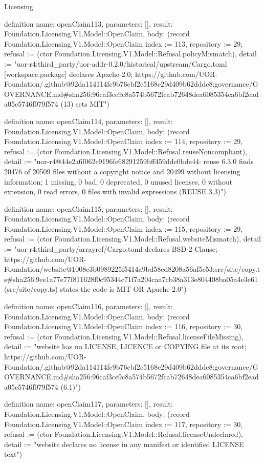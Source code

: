 \begin{lexlean}{Licensing}
\begin{semanticmodule}
definition{
  name: openClaim113,
  parameters: [],
  result: Foundation.Licensing.V1.Model::OpenClaim,
  body: (record Foundation.Licensing.V1.Model::OpenClaim {index := 113, repository := 29, refusal := (ctor Foundation.Licensing.V1.Model::Refusal.policyMismatch), detail := "uor-r4:third_party/uor-addr-0.2.0/historical/upstream/Cargo.toml [workspace.package] declares Apache-2.0; https://github.com/UOR-Foundation/.github@92da114114fc9b76cbf2c5168e29d409b62ddde8:governance/GOVERNANCE.md#sha256:96caf3ce9c8a574b5672fcab72648dea6085354ca6bf2eada05e5746f079f574 (13) sets MIT"})
}

definition{
  name: openClaim114,
  parameters: [],
  result: Foundation.Licensing.V1.Model::OpenClaim,
  body: (record Foundation.Licensing.V1.Model::OpenClaim {index := 114, repository := 29, refusal := (ctor Foundation.Licensing.V1.Model::Refusal.reuseNoncompliant), detail := "uor-r4@44e2a6f062e9196fe68291259bff459dde0bde44: reuse 6.3.0 finds 20476 of 20509 files without a copyright notice and 20499 without licensing information; 1 missing, 0 bad, 0 deprecated, 0 unused licenses, 0 without extension, 0 read errors, 0 files with invalid expressions (REUSE 3.3)"})
}

definition{
  name: openClaim115,
  parameters: [],
  result: Foundation.Licensing.V1.Model::OpenClaim,
  body: (record Foundation.Licensing.V1.Model::OpenClaim {index := 115, repository := 29, refusal := (ctor Foundation.Licensing.V1.Model::Refusal.websiteMismatch), detail := "uor-r4:third_party/arrayref/Cargo.toml declares BSD-2-Clause; https://github.com/UOR-Foundation/website@1008c3b0989225f5414a9bd58ed8208a56af5e53:src/site/copy.ts#sha256:9ee1a77e77f811628f0c95344c71f7a204caa7cb38a313e804408ba05a4e3e61 (src/site/copy.ts) states the code is MIT OR Apache-2.0"})
}

definition{
  name: openClaim116,
  parameters: [],
  result: Foundation.Licensing.V1.Model::OpenClaim,
  body: (record Foundation.Licensing.V1.Model::OpenClaim {index := 116, repository := 30, refusal := (ctor Foundation.Licensing.V1.Model::Refusal.licenseFileMissing), detail := "website has no LICENSE, LICENCE or COPYING file at its root; https://github.com/UOR-Foundation/.github@92da114114fc9b76cbf2c5168e29d409b62ddde8:governance/GOVERNANCE.md#sha256:96caf3ce9c8a574b5672fcab72648dea6085354ca6bf2eada05e5746f079f574 (6.1)"})
}

definition{
  name: openClaim117,
  parameters: [],
  result: Foundation.Licensing.V1.Model::OpenClaim,
  body: (record Foundation.Licensing.V1.Model::OpenClaim {index := 117, repository := 30, refusal := (ctor Foundation.Licensing.V1.Model::Refusal.licenseUndeclared), detail := "website declares no license in any manifest or identified LICENSE text"})
}


\end{semanticmodule}
\end{lexlean}
